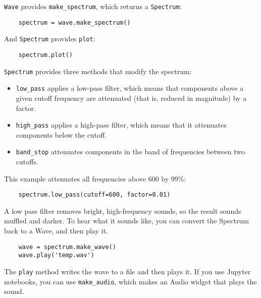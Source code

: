 {\tt Wave} provides \verb"make_spectrum", which returns a
{\tt Spectrum}:

\begin{verbatim}
	spectrum = wave.make_spectrum()
\end{verbatim}

And {\tt Spectrum} provides {\tt plot}:

\begin{verbatim}
	spectrum.plot()
\end{verbatim}


{\tt Spectrum} provides three methods that modify the spectrum:

\begin{itemize}
	
	\item \verb"low_pass" applies a low-pass filter, which means that
	components above a given cutoff frequency are attenuated (that is,
	reduced in magnitude) by a factor.
	
	\item \verb"high_pass" applies a high-pass filter, which means that
	it attenuates components below the cutoff.
	
	\item \verb"band_stop" attenuates components in the band of
	frequencies between two cutoffs.
	
\end{itemize}

This example attenuates all frequencies above 600 by 99\%:

\begin{verbatim}
	spectrum.low_pass(cutoff=600, factor=0.01)
\end{verbatim}

A low pass filter removes bright, high-frequency sounds, so
the result sounds muffled and darker.  To hear what it sounds
like, you can convert the Spectrum back to a Wave, and then play it.

\begin{verbatim}
	wave = spectrum.make_wave()
	wave.play('temp.wav')
\end{verbatim}

The {\tt play} method writes the wave to a file and then plays it.
If you use Jupyter notebooks, you can use \verb"make_audio", which
makes an Audio widget that plays the sound.


